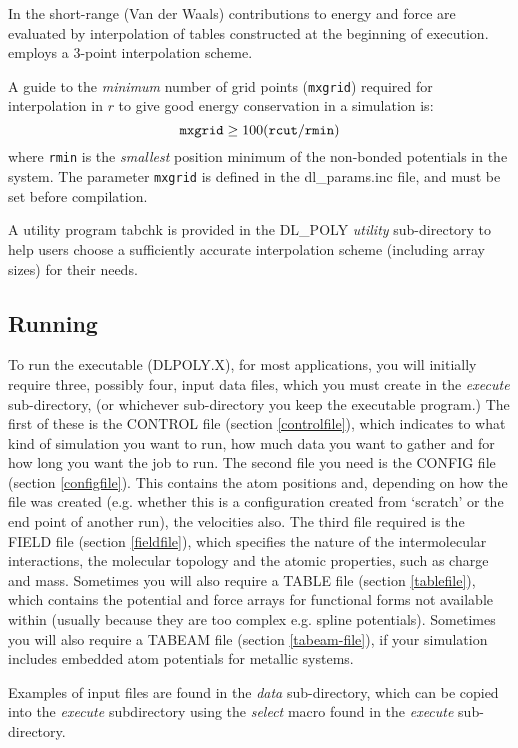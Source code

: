 In \D{} the short-range (Van der Waals)
contributions to energy and force are evaluated by interpolation of
tables constructed at the beginning of execution. \D{} employs a 3-point
interpolation scheme.

A guide to the {\em minimum} number of grid points ({\tt mxgrid})
required for interpolation in $r$ to
give good energy conservation in a simulation is:
\[{\tt mxgrid} \ge 100 ({\tt rcut/rmin})\]
where {\tt rmin} is the {\em smallest} position minimum of the
non-bonded potentials in the system.  The parameter {\tt mxgrid} is
defined in the {\sc dl\_params.inc} file, and must be set before
compilation.

A utility program {\sc tabchk} is provided in the DL\_POLY {\em
utility} sub-directory to help users choose a sufficiently accurate 
interpolation scheme (including array sizes) for their needs.

\subsection{Running \D{}}

To run the \D{} executable (DLPOLY.X), for most applications,
you will initially require three,
possibly four, input data files, which you must create in the {\em
execute} sub-directory, (or whichever sub-directory you keep the
executable program.) The first of these is the CONTROL file (section
\ref{controlfile}), which indicates to \D{} what kind of simulation you
want to run, how much data you want to gather and for how long you
want the job to run. The second file you need is the CONFIG file
(section \ref{configfile}). This contains the atom positions and,
depending on how the file was created (e.g. whether this is a
configuration created from `scratch' or the end point of another run),
the velocities also. The third file required is the FIELD file
(section \ref{fieldfile}), which specifies the nature of the
intermolecular interactions, the molecular topology and the atomic
properties, such as charge and mass.  Sometimes you will also require
a TABLE file (section \ref{tablefile}), which contains the
potential and force arrays for functional forms not available within
\D{} (usually because they are too complex e.g. spline
potentials). Sometimes you will also require a TABEAM file 
(section \ref{tabeam-file}), if your simulation includes embedded 
atom potentials for metallic systems.

Examples of input files are found in the {\em data} sub-directory,
which can be copied into the {\em execute} subdirectory using the {\sl
select} macro found in the {\em execute} sub-directory.

